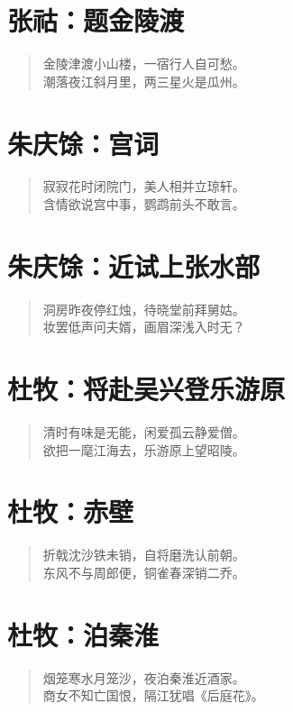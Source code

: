 \documentclass[12pt,oneside]{book}
\newenvironment{shici}{
\begin{verse}
\centering\large\hspace{12pt}}
{\end{verse}}
\begin{document}
\chapter{张祜：题金陵渡}
\begin{shici}
金陵津渡小山楼，一宿行人自可愁。\\
潮落夜江斜月里，两三星火是瓜州。
\end{shici}

\chapter{朱庆馀：宫词}
\begin{shici}
寂寂花时闭院门，美人相并立琼轩。\\
含情欲说宫中事，鹦鹉前头不敢言。
\end{shici}

\chapter{朱庆馀：近试上张水部}
\begin{shici}
洞房昨夜停红烛，待晓堂前拜舅姑。\\
妆罢低声问夫婿，画眉深浅入时无？
\end{shici}

\chapter{杜牧：将赴吴兴登乐游原}
\begin{shici}
清时有味是无能，闲爱孤云静爱僧。\\
欲把一麾江海去，乐游原上望昭陵。
\end{shici}

\chapter{杜牧：赤壁}
\begin{shici}
折戟沈沙铁未销，自将磨洗认前朝。\\
东风不与周郎便，铜雀春深销二乔。
\end{shici}

\chapter{杜牧：泊秦淮}
\begin{shici}
烟笼寒水月笼沙，夜泊秦淮近酒家。\\
商女不知亡国恨，隔江犹唱《后庭花》。
\end{shici}
\end{document}
